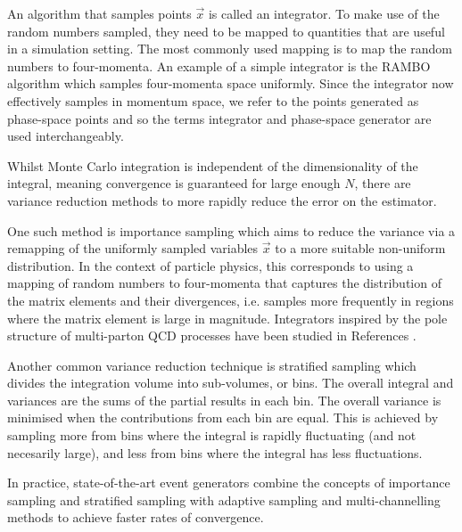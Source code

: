 \documentclass[main.tex]{subfiles}
\begin{document}
    An algorithm that samples points $\vec{x}$ is called
    an integrator. To make use of the random numbers sampled,
    they need to be mapped to quantities that are useful in a simulation
    setting. The most commonly used mapping is to map
    the random numbers to four-momenta. An example of a
    simple integrator is the RAMBO algorithm \cite{Kleiss:1985gy,Platzer:2013esa}
    which samples four-momenta space uniformly. Since the integrator
    now effectively samples in momentum space, we refer to the points
    generated as phase-space points and so the terms integrator
    and phase-space generator are used interchangeably.

    Whilst Monte Carlo integration is independent of the
    dimensionality of the integral, meaning convergence is
    guaranteed for large enough $N$, there are variance
    reduction methods to more rapidly reduce the error
    on the estimator.

    One such method is importance sampling which
    aims to reduce the variance via a remapping of the
    uniformly sampled variables $\vec{x}$
    to a more suitable non-uniform distribution.
    In the context of particle physics,
    this corresponds to using a mapping of random numbers
    to four-momenta that captures the distribution of the
    matrix elements and their divergences, i.e. samples
    more frequently in regions where the matrix element
    is large in magnitude. Integrators inspired by the pole
    structure of multi-parton QCD processes have been
    studied in References \cite{Draggiotis:2000gm,vanHameren:2002tc}.
    
    Another common variance reduction technique is
    stratified sampling which divides the integration
    volume into sub-volumes, or bins. The overall integral
    and variances are the sums of the partial results
    in each bin. The overall variance is minimised when
    the contributions from each bin are equal. This
    is achieved by sampling more from bins where the integral
    is rapidly fluctuating (and not necesarily large),
    and less from bins where the integral has less fluctuations.
    
    In practice, state-of-the-art event generators
    combine the concepts of importance sampling and stratified
    sampling with adaptive sampling \cite{Lepage:1977sw,Lepage:2020tgj}
    and multi-channelling methods \cite{Kleiss:1994qy,Ohl:1998jn}
    to achieve faster rates of convergence.
\end{document}
